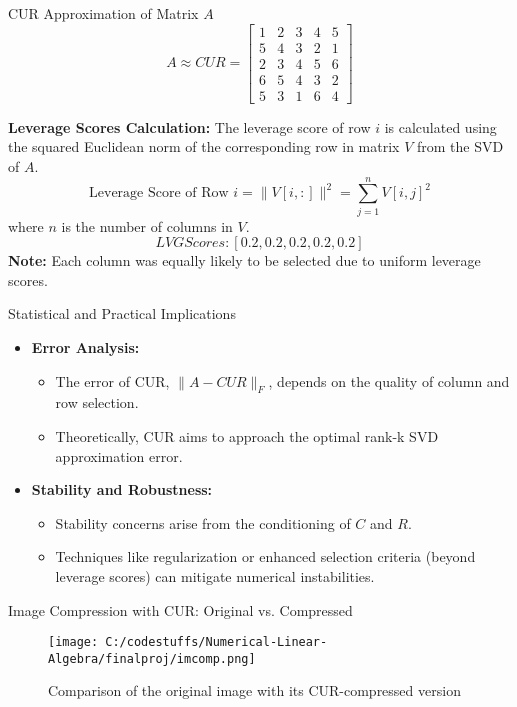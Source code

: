 \documentclass[pdf]{beamer}
\begin{document}
\begin{frame}{CUR Approximation of Matrix \( A \)}
    \[
    A \approx CUR = \begin{bmatrix} 1 & 2 & 3 & 4 & 5 \\ 5 & 4 & 3 & 2 & 1 \\ 2 & 3 & 4 & 5 & 6 \\ 6 & 5 & 4 & 3 & 2 \\ 5 & 3 & 1 & 6 & 4 \end{bmatrix}
    \]

    \textbf{Leverage Scores Calculation:}
    The leverage score of row \( i \) is calculated using the squared Euclidean norm of the corresponding row in matrix \( V \) from the SVD of \( A \).
    \[
    \text{Leverage Score of Row } i = \| V[i, :] \|^2 = \sum_{j=1}^{n} V[i, j]^2
    \]
    where \( n \) is the number of columns in \( V \). 
    \[
    LVG Scores: [0.2, 0.2, 0.2, 0.2, 0.2]
    \]
    \textbf{Note:} Each column was equally likely to be selected due to uniform leverage scores.
\end{frame}

\begin{frame}{Statistical and Practical Implications}
    \begin{itemize}
        \item \textbf{Error Analysis:}
            \begin{itemize}
                \item The error of CUR, \( \| A - CUR \|_F \), depends on the quality of column and row selection.
                \item Theoretically, CUR aims to approach the optimal rank-k SVD approximation error.
            \end{itemize}
        \item \textbf{Stability and Robustness:}
            \begin{itemize}
                \item Stability concerns arise from the conditioning of \( C \) and \( R \).
                \item Techniques like regularization or enhanced selection criteria (beyond leverage scores) can mitigate numerical instabilities.
            \end{itemize}
    \end{itemize}
\end{frame}

\begin{frame}{Image Compression with CUR: Original vs. Compressed}
    \begin{figure}
        \centering
        \texttt{[image: C:/codestuffs/Numerical-Linear-Algebra/finalproj/imcomp.png]}
        \caption{Comparison of the original image with its CUR-compressed version}
        \label{fig:lena_compression}
    \end{figure}
\end{frame}
\end{document}

